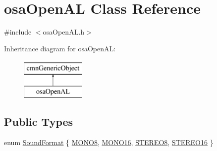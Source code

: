 \hypertarget{classosa_open_a_l}{}\section{osa\+Open\+A\+L Class Reference}
\label{classosa_open_a_l}


{\ttfamily \#include $<$osa\+Open\+A\+L.\+h$>$}

Inheritance diagram for osa\+Open\+A\+L\+:\begin{figure}[H]
\begin{center}
\leavevmode
\includegraphics[height=2.000000cm]{d9/df2/classosa_open_a_l}
\end{center}
\end{figure}
\subsection*{Public Types}
\begin{DoxyCompactItemize}
\item 
enum \hyperlink{classosa_open_a_l_a81e53573c5d1e8cdcba2cc00784228f2}{Sound\+Format} \{ \hyperlink{classosa_open_a_l_a81e53573c5d1e8cdcba2cc00784228f2ab1e23fa51394321d18b4d36466a74af3}{M\+O\+N\+O8}, 
\hyperlink{classosa_open_a_l_a81e53573c5d1e8cdcba2cc00784228f2ac4ac9b5df84b02ac608e9bceef1e63c7}{M\+O\+N\+O16}, 
\hyperlink{classosa_open_a_l_a81e53573c5d1e8cdcba2cc00784228f2a7f430aef18c2591cd1e88c2d997b9e63}{S\+T\+E\+R\+E\+O8}, 
\hyperlink{classosa_open_a_l_a81e53573c5d1e8cdcba2cc00784228f2a5df4300053eb0ae431ce08e932032ffa}{S\+T\+E\+R\+E\+O16}
 \}
\end{DoxyCompactItemize}
